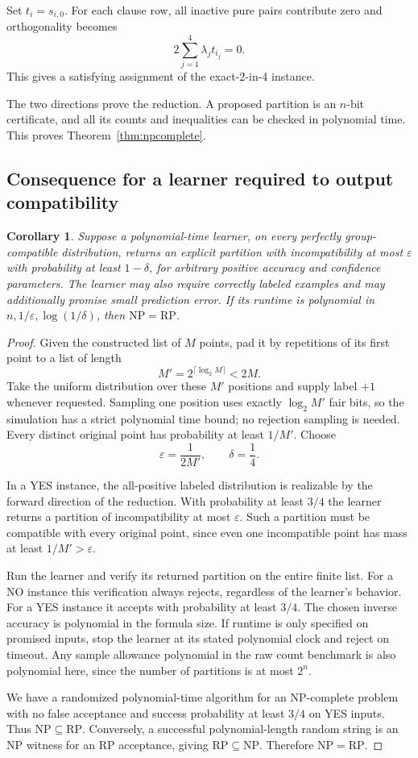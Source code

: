 \documentclass[11pt,a4paper]{article}
\newtheorem{corollary}[theorem]{Corollary}
\theoremstyle{remark}
\newcommand{\1}{\mathbf 1}
\newcommand{\RP}{\mathrm{RP}}
\newcommand{\NP}{\mathrm{NP}}
\begin{document}
Set $t_i=s_{i,0}$. For each clause row, all inactive pure pairs contribute
zero and orthogonality becomes
\[
 2\sum_{j=1}^4\lambda_jt_{i_j}=0.
\]
This gives a satisfying assignment of the exact-2-in-4 instance.

The two directions prove the reduction. A proposed partition is an $n$-bit
certificate, and all its counts and inequalities can be checked in polynomial
time. This proves Theorem~\ref{thm:npcomplete}.

\subsection{Consequence for a learner required to output compatibility}

\begin{corollary}\label{cor:rp}
Suppose a polynomial-time learner, on every perfectly group-compatible
distribution, returns an explicit partition with incompatibility at most
$\varepsilon$ with probability at least $1-\delta$, for arbitrary positive
accuracy and confidence parameters. The learner may also require correctly
labeled examples and may additionally promise small prediction error.
If its runtime is polynomial in $n,1/\varepsilon,\log(1/\delta)$, then
$\NP=\RP$.
\end{corollary}
\begin{proof}
Given the constructed list of $M$ points, pad it by repetitions of its first
point to a list of length
\[
 M'=2^{\lceil\log_2 M\rceil}<2M.
\]
Take the uniform distribution over these $M'$ positions and supply label $+1$
whenever requested. Sampling one position uses exactly $\log_2M'$ fair bits,
so the simulation has a strict polynomial time bound; no rejection sampling
is needed. Every distinct original point has probability at least $1/M'$.
Choose
\[
 \varepsilon=\frac1{2M'},\qquad\delta=\frac14.
\]

In a YES instance, the all-positive labeled distribution is realizable by
the forward direction of the reduction. With probability at least $3/4$ the
learner returns a partition of incompatibility at most $\varepsilon$.
Such a partition must be compatible with every original point, since even
one incompatible point has mass at least $1/M'>\varepsilon$.

Run the learner and verify its returned partition on the entire finite list.
For a NO instance this verification always rejects, regardless of the learner's
behavior. For a YES instance it accepts with probability at least $3/4$.
The chosen inverse accuracy is polynomial in the formula size. If runtime is
only specified on promised inputs, stop the learner at its stated polynomial
clock and reject on timeout. Any sample allowance polynomial in the raw count
benchmark is also polynomial here, since the number of partitions is at most
$2^n$.

We have a randomized polynomial-time algorithm for an NP-complete problem
with no false acceptance and success probability at least $3/4$ on YES inputs.
Thus $\NP\subseteq\RP$. Conversely, a successful polynomial-length random
string is an NP witness for an RP acceptance, giving $\RP\subseteq\NP$.
Therefore $\NP=\RP$.
\end{proof}
\end{document}
